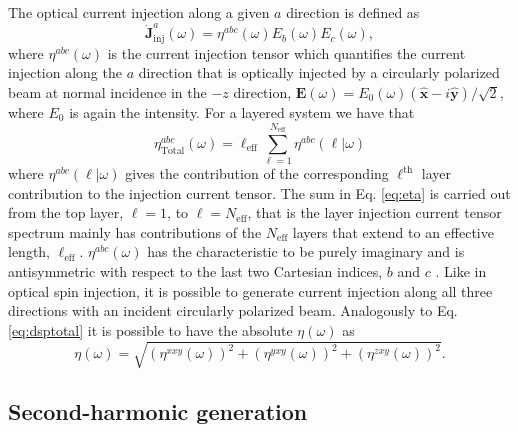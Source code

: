 \documentclass[pss]{wiley2sp} %
\begin{document}
The optical current injection along a given $a$ direction is defined  \cite{arzatePRB14} as
\begin{equation*}
\mathbf{\dot{J}}^{a}_{\text{inj}}(\omega) =
\eta^{abc}(\omega)E_{b}(\omega)E_{c}(\omega), \label{eq:current}
\end{equation*}
where $\eta^{abc}(\omega)$ is the current injection tensor which quantifies the current injection along the $a$ direction that is optically injected by a circularly polarized beam at normal incidence in the $-z$  direction, $\mathbf{E}(\omega) = E_{0}(\omega)(\mathbf{\hat{x}} - i\mathbf{\hat{y}})/\sqrt{2}$, where $E_{0}$ is again the intensity. For a layered system we have that 
\begin{equation}\label{eq:eta}
\eta^{abc}_{\mathrm{Total}}(\omega)= \ell_{\mathrm{eff}}\sum_{\ell=1}^{N_{\mathrm{eff}}}\eta^{abc}(\ell|\omega)
\end{equation}
where $\eta^{abc}(\ell|\omega)$ gives the contribution of the corresponding $\ell^{\mathrm{th}}$ layer contribution to the injection current tensor. The sum in Eq. \eqref{eq:eta} is carried out from the top layer, $\ell=1$, to $\ell=N_{\mathrm{eff}}$, that is the layer injection current tensor spectrum mainly has contributions of the $N_{\mathrm{eff}}$ layers that extend to an effective length, $\ell_{\mathrm{eff}}$. $\eta^{abc}(\omega)$ has the characteristic to be purely imaginary and is antisymmetric with respect to the last two Cartesian indices, $b$ and $c$ \cite{arzatePRB14,sipePRB00,nastosPRB10}. Like in optical spin
injection, it is possible to generate current injection along all three
directions with an incident circularly polarized beam. Analogously to Eq.
\eqref{eq:dsptotal} it is possible to have the absolute $\eta(\omega)$ \cite{arzatePRB14} as
\begin{equation}\label{eq:etatotal}
\eta(\omega) =
\sqrt{(\eta^{xxy}(\omega))^{2} +
      (\eta^{yxy}(\omega))^{2} +
      (\eta^{zxy}(\omega))^{2}
      }.
\end{equation}


\subsection{Second-harmonic generation}\label{sec:theory-SHG}
\end{document}
